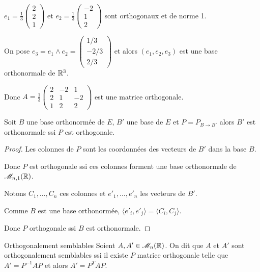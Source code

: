 \begin{exemple}
    $e_1 = \frac 1 3 \begin{pmatrix}
        2 \\ 2  \\ 1
    \end{pmatrix}$ et $e_2 = \frac 1 3 \begin{pmatrix}
        -2 \\ 1 \\2 
    \end{pmatrix}$ sont orthogonaux et de norme 1.

    On pose $e_3 = e_1 \wedge e_2 = \begin{pmatrix}
        1/3 \\ -2/3 \\ 2/3
    \end{pmatrix}$ et alors $(e_1, e_2, e_3)$ est une base orthonormale de $\mathbb{R}^3$.

    Donc $A = \frac 1 3\begin{pmatrix}
        2 & -2 & 1 \\
        2 & 1 & -2 \\
        1 & 2 & 2
    \end{pmatrix}$ est une matrice orthogonale.
\end{exemple}

\begin{theoreme}{}{}
    Soit $B$ une base orthonormée de $E$, $B'$ une base de $E$
    et $P = P_{B \to B'}$ alors $B'$ est orthonormale ssi $P$ est orthogonale. 
\end{theoreme}

\begin{proof}
    Les colonnes de $P$ sont les coordonnées des vecteurs de $B'$ dans la base $B$. 

    Donc $P$ est orthogonale ssi ces colonnes forment une base orthonormale de $\mathscr M_{n, 1}(\mathbb{R})$.
     
    Notons $C_1, \dots, C_n$ ces colonnes et $e'_1, \dots, e'_n$ les vecteurs de $B'$. 

    Comme $B$ est une base orthonormée, $\langle e'_i, e'_j \rangle = \langle C_i, C_j \rangle$.

    Donc $P$ orthogonale ssi $B$ est orthonormale. 
\end{proof}

\begin{definition}{Orthogonalement semblables}{}
    Soient $A, A' \in \mathscr M_n(\mathbb{R})$. On dit que $A$ et $A'$ sont orthogonalement semblables ssi 
    il existe $P$ matrice orthogonale telle que $A' = P^{-1} A P$ et alors 
    $A' = P^T A P$.
\end{definition}

